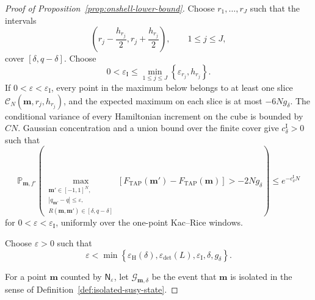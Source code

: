 \documentclass[10pt,a4paper]{amsart}
\newcommand{\TAP}{\mathrm{TAP}}
\newcommand{\bfm}{\mathbf{m}}
\newcommand{\dP}{\mathbb{P}}%
\newcommand{\mc}{\mathcal}
\newcommand{\ve}{\varepsilon}
\begin{document}
\begin{proof}[Proof of Proposition~\ref{prop:onshell-lower-bound}]
		Choose \(r_1,\ldots,r_J\) such that the intervals
		\[
		\left(r_j-\frac{h_{r_j}}2,r_j+\frac{h_{r_j}}2\right),
		\qquad 1\le j\le J,
		\]
		cover \([\delta,q-\delta]\). Choose
		\[
		0<\ve_{\mathrm I}
		\le
		\min_{1\le j\le J}
		\left\{\ve_{r_j},h_{r_j}\right\}.
		\]
		If \(0<\ve<\ve_{\mathrm I}\), every point in the maximum
		below belongs to at least one slice
		\(\mc C_N(\bfm,r_j,h_{r_j})\), and the expected maximum on each slice is at
		most \(-6Ng_\delta\). The conditional variance of every Hamiltonian
		increment on the cube is bounded by \(CN\). Gaussian concentration and
		a union bound over the finite cover give \(c_\delta^{\mathrm I}>0\) such
		that
		\begin{equation}\label{eq:sibling-uniform-intermediate}
			\dP_{\bfm,f'}\left(
			\max_{\substack{
					\bfm'\in[-1,1]^N,\\
					|q_{\bfm'}-q|\le\ve,\\
					R(\bfm,\bfm')\in[\delta,q-\delta]
			}}
			\left[F_{\TAP}(\bfm')-F_{\TAP}(\bfm)\right]
			>-2Ng_\delta
			\right)
			\le e^{-c_\delta^{\mathrm I}N}
		\end{equation}
		for \(0<\ve<\ve_{\mathrm I}\), uniformly over the
		one-point Kac--Rice windows.
		
		Choose \(\ve>0\) such that
		\begin{equation}\label{eq:susy-geometric-parameter-choice}
			\ve
			<
			\min\left\{
			\ve_{\mathrm H}(\delta),\ve_{\det}(L),
			\ve_{\mathrm I},
			\delta,g_\delta
			\right\}.
		\end{equation}
		
		For a point \(\bfm\) counted by \(\mathsf N_\ve\), let
		\(\mathcal G_{\bfm,\delta}\) be the event that \(\bfm\) is isolated in
		the sense of Definition~\ref{def:isolated-susy-state}.
		

\end{proof}
\end{document}
